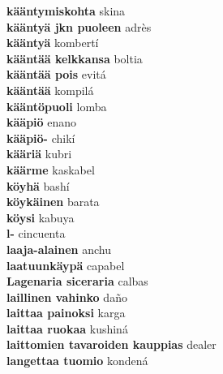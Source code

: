 \textbf{ kääntymiskohta  } skina \\
\textbf{ kääntyä jkn puoleen  } adrès \\
\textbf{ kääntyä  } kombertí \\
\textbf{ kääntää kelkkansa  } boltia \\
\textbf{ kääntää pois  } evitá \\
\textbf{ kääntää  } kompilá \\
\textbf{ kääntöpuoli  } lomba \\
\textbf{ kääpiö  } enano \\
\textbf{ kääpiö-  } chikí \\
\textbf{ kääriä  } kubri \\
\textbf{ käärme  } kaskabel \\
\textbf{ köyhä  } bashí \\
\textbf{ köykäinen  } barata \\
\textbf{ köysi  } kabuya \\
\textbf{ l-  } cincuenta \\
\textbf{ laaja-alainen  } anchu \\
\textbf{ laatuunkäypä  } capabel \\
\textbf{ Lagenaria siceraria  } calbas \\
\textbf{ laillinen vahinko  } daño \\
\textbf{ laittaa painoksi  } karga \\
\textbf{ laittaa ruokaa  } kushiná \\
\textbf{ laittomien tavaroiden kauppias  } dealer \\
\textbf{ langettaa tuomio  } kondená \\
